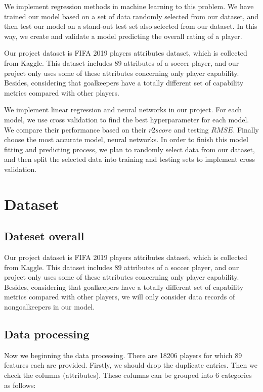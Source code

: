 \documentclass{article}
\begin{document}
We implement regression methods in machine learning to this problem.
We have trained our model based on a set of data randomly selected from our
dataset, and then test our model on a stand-out test set also selected from our
dataset. In this way, we create and validate a model predicting the overall
rating of a player.


Our project dataset is FIFA 2019 players attributes dataset, which is collected
from Kaggle. This dataset includes 89 attributes of a soccer player, and our
project only uses some of these attributes concerning only player capability.
Besides, considering that goalkeepers have a totally different set of capability
metrics compared with other players.

We implement linear regression and neural networks in our project. For each model, we use cross validation to find the
best hyperparameter for each model. We compare their performance based
on their $r2 score$ and testing $RMSE$. Finally choose the most accurate model, neural networks. In order to finish this model fitting and predicting process, we plan
to randomly select data from our dataset, and then split the selected data into
training and testing sets to implement cross validation.


\section*{Dataset}

\subsection{Dateset overall}

Our project dataset is FIFA 2019 players attributes dataset, which is collected
from Kaggle. This dataset includes 89 attributes of a soccer player, and our
project only uses some of these attributes concerning only player capability.
Besides, considering that goalkeepers have a totally different set of capability
metrics compared with other players, we will only consider data records of nongoalkeepers in our model.

\subsection{Data processing}

Now we beginning the data processing.
There are 18206 players for which 89 features each are provided. Firstly, we should drop the duplicate entries. 
Then we check the columns (attributes). These columns can be grouped into 6 categories as follows: 
\end{document}

